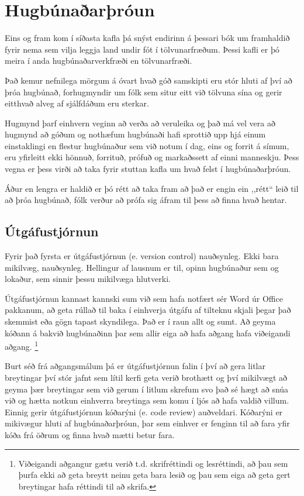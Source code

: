 
\chapter{Hugbúnaðarþróun}\label{k:dev}
Eins og fram kom í síðasta kafla þá snýst endirinn á þessari bók um framhaldið fyrir nema sem vilja leggja land undir fót í tölvunarfræðum.
Þessi kafli er þó meira í anda hugbúnaðarverkfræði en tölvunarfræði.

Það kemur nefnilega mörgum á óvart hvað góð samskipti eru stór hluti af því að þróa hugbúnað, forhugmyndir um fólk sem situr eitt við tölvuna sína og gerir eitthvað alveg af sjálfdáðum eru sterkar.

Hugmynd þarf einhvern veginn að verða að veruleika og það má vel vera að hugmynd að góðum og nothæfum hugbúnaði hafi sprottið upp hjá einum einstaklingi en flestur hugbúnaður sem við notum í dag, eins og forrit á símum, eru yfirleitt ekki hönnuð, forrituð, prófuð og markaðssett af einni manneskju.
Þess vegna er þess virði að taka fyrir stuttan kafla um hvað felst í hugbúnaðarþróun.

Áður en lengra er haldið er þó rétt að taka fram að það er engin ein ,,rétt“ leið til að þróa hugbúnað, fólk verður að prófa sig áfram til þess að finna hvað hentar.

\section{Útgáfustjórnun}
Fyrir það fyrsta er útgáfustjórnun (e. version control) nauðsynleg.
Ekki bara mikilvæg, nauðsynleg.
Hellingur af lausnum er til, opinn hugbúnaður sem og lokaður, sem sinnir þessu mikilvæga hlutverki.

Útgáfustjórnun kannast kannski sum við sem hafa notfært sér Word úr Office pakkanum, að geta rúllað til baka í einhverja útgáfu af tilteknu skjali þegar það skemmist eða gögn tapast skyndilega.
Það er í raun allt og sumt.
Að geyma kóðann á bakvið hugbúnaðinn þar sem allir eiga að hafa aðgang hafa viðeigandi aðgang.
\footnote{Viðeigandi aðgangur gætu verið t.d. skrifréttindi og lesréttindi, að þau sem þurfa ekki að geta breytt neinu geta bara lesið og þau sem eiga að geta gert breytingar hafa réttindi til að skrifa.}

Burt séð frá aðgangsmálum þá er útgáfustjórnun falin í því að gera litlar breytingar því stór jafnt sem lítil kerfi geta verið brothætt og því mikilvægt að geyma þær breytingar sem við gerum í litlum skrefum svo það sé hægt að snúa við og hætta notkun einhverra breytinga sem komu í ljós að hafa valdið villum.
Einnig gerir útgáfustjórnun kóðarýni (e. code review) auðveldari.
Kóðarýni er mikivægur hluti af hugbúnaðarþróun, þar sem einhver er fenginn til að fara yfir kóða frá öðrum og finna hvað mætti betur fara.

